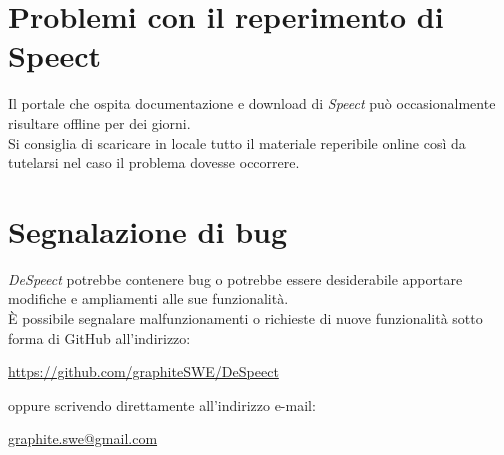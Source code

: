 \documentclass[openany,12pt,a4paper]{report}
\begin{document}
	\section{Problemi con il reperimento di Speect}	
	Il portale che ospita documentazione e download di \textit{Speect} può occasionalmente risultare offline per dei giorni.\\
	Si consiglia di scaricare in locale  tutto il materiale reperibile online così da tutelarsi nel caso il problema dovesse occorrere.
	
	\section{Segnalazione di bug}
	
	\textit{DeSpeect} potrebbe contenere bug o potrebbe essere desiderabile apportare modifiche e ampliamenti alle sue funzionalità. \\ È possibile segnalare malfunzionamenti o richieste di nuove funzionalità sotto forma di GitHub  all’indirizzo:
	\begin{center}
		\url{https://github.com/graphiteSWE/DeSpeect}
	\end{center}
  oppure scrivendo direttamente all'indirizzo e-mail:
  \begin{center}
  	\url{graphite.swe@gmail.com}
  \end{center}
	
	\appendix
	
	\printglossary[style=glossaryStyle, nonumberlist]
	
\end{document}

